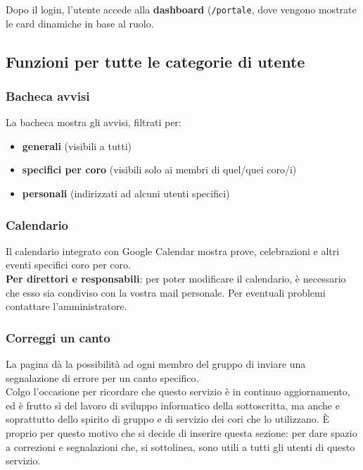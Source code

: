 \documentclass[a4paper,12pt]{article}
\begin{document}
	Dopo il login, l'utente accede alla \textbf{dashboard} (\texttt{/portale}, dove vengono mostrate le card dinamiche in base al ruolo.\\
	
	\subsection{Funzioni per tutte le categorie di utente}
	\subsubsection{Bacheca avvisi}
	La bacheca mostra gli avvisi, filtrati per:
	\begin{itemize}
		\item \textbf{generali} (visibili a tutti)
		\item \textbf{specifici per coro} (visibili solo ai membri di quel/quei coro/i)
		\item \textbf{personali} (indirizzati ad alcuni utenti specifici)
	\end{itemize}
	
	\subsubsection{Calendario}
	Il calendario integrato con Google Calendar mostra prove, celebrazioni e altri eventi specifici  coro per coro.\\
	
	\textbf{Per direttori e responsabili}: per poter modificare il calendario, è necessario che esso sia condiviso con la vostra mail personale. Per eventuali problemi contattare l'amministratore.
	
	\subsubsection{Correggi un canto}
	La pagina dà la possibilità ad ogni membro del gruppo di inviare una segnalazione di errore per un canto specifico.\\
	Colgo l'occasione per ricordare che questo servizio è in continuo aggiornamento, ed è frutto sì del lavoro di sviluppo informatico della sottoscritta, ma anche e soprattutto dello spirito di gruppo e di servizio dei cori che lo utilizzano. È proprio per questo motivo che si decide di inserire questa sezione: per dare spazio a correzioni e segnalazioni che, si sottolinea, sono utili a tutti gli utenti di questo servizio.
	
\end{document}

